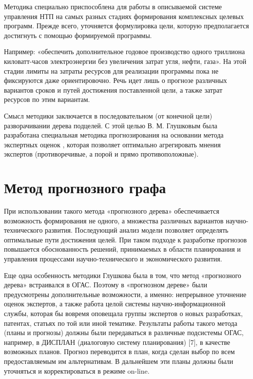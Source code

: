 Методика специально приспособлена для работы в описываемой системе управления
НТП на самых разных стадиях формирования комплексных целевых программ. Прежде
всего, уточняется формулировка цели, которую предполагается достигнуть с помощью
формируемой программы.
 
Например: «обеспечить дополнительное годовое производство одного триллиона
киловатт-часов электроэнергии без увеличения затрат угля, нефти, газа». На этой
стадии лимиты на затраты ресурсов для реализации программы пока не фиксируются
даже ориентировочно. Речь идет лишь о прогнозе различных вариантов сроков и
путей достижения поставленной цели, а также затрат ресурсов по этим вариантам.
 
Смысл методики заключается в последовательном (от конечной цели) разворачивании
дерева подцелей. С этой целью В. М. Глушковым была разработана специальная
методика прогнозирования на основании метода экспертных оценок \cite{b2},
которая позволяет оптимально агрегировать мнения экспертов (противоречивые, а
порой и прямо противоположные).
 
\section{Метод прогнозного графа}
 
При использовании такого метода «прогнозного дерева» обеспечивается возможность
формирования не одного, а множества различных вариантов научно-технического
развития. Последующий анализ модели позволяет определять оптимальные пути
достижения целей. При таком подходе к разработке прогнозов повышается
обоснованность решений, принимаемых в области планирования и управления
процессами научно-технического и экономического развития.
 
Еще одна особенность методики Глушкова была в том, что метод «прогнозного
дерева» встраивался в ОГАС. Поэтому в «прогнозном дереве» были предусмотрены
дополнительные возможности, а именно: непрерывное уточнение оценок экспертов, а
также работа целой системы научно-информационной службы, которая бы вовремя
оповещала группы экспертов о новых разработках, патентах, статьях по той или
иной тематике. Результаты работы такого метода (планы и прогнозы) должны были
передаваться в различные подсистемы ОГАС, например, в ДИСПЛАН (диалоговую
систему планирования) [7], в качестве возможных планов. Прогноз переводится в
план, когда сделан выбор по всем предоставляемым им альтернативам. В дальнейшем
эти планы должны были уточняться и корректироваться в режиме on-line.
 
